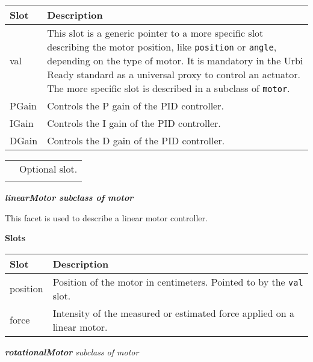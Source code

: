 \documentclass[a4paper]{article}
\begin{document}
\begin{flushleft}
\tablehead{}
\begin{supertabular}{|m{2.8669999cm}|m{12.422cm}|}
\hline
{}\sffamily\bfseries Slot &
\sffamily\bfseries Description\\\hline
{} val &
\sffamily This slot is a generic pointer to a
more specific slot describing the motor position, like
\texttt{position} or \texttt{angle}, depending on the type of motor. It
is mandatory in the Urbi Ready standard as a universal proxy to control
an actuator. The more specific slot is described in a subclass of
\texttt{motor}.\\\hline
{} PGain &
\sffamily Controls the P gain of the PID
controller.\\\hline
{} IGain &
\sffamily Controls the I gain of the PID
controller.\\\hline
{} DGain &
\sffamily Controls the D gain of the PID
controller.\\\hline
\end{supertabular}
\end{flushleft}
\begin{flushleft}
\tablehead{}
\begin{supertabular}{|m{1.717cm}|m{10.464cm}}
\hhline{-~}
 &
\sffamily Optional slot.\\\hhline{-~}
\end{supertabular}
\end{flushleft}
{\sffamily\bfseries\itshape
 linearMotor  \textmd{subclass of motor}}

{\sffamily
This facet is used to describe a linear motor controller.}

{\sffamily\bfseries
Slots}

\begin{flushleft}
\tablehead{}
\begin{supertabular}{|m{2.8669999cm}|m{12.422cm}|}
\hline
{}\sffamily\bfseries Slot &
\sffamily\bfseries Description\\\hline
{} position &
\sffamily Position of the motor in centimeters.
Pointed to by the \texttt{val} slot.\\\hline
{} force &
\sffamily Intensity of the measured or estimated
force applied on a linear motor.\\\hline
\end{supertabular}
\end{flushleft}
{
    
\foreignlanguage{english}{\textsf{\textbf{\textit{rotationalMotor}}}} 
\foreignlanguage{english}{\textsf{\textit{subclass of motor}}}}
\end{document}
